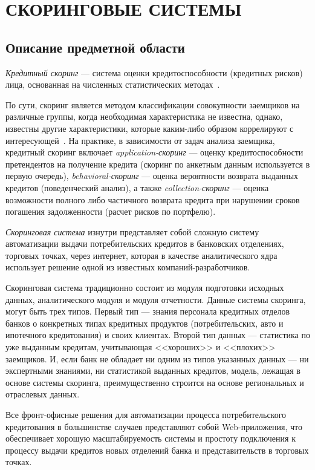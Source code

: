 \section[Скоринговые системы]{СКОРИНГОВЫЕ СИСТЕМЫ}

\subsection{Описание предметной области}

\emph{Кредитный скоринг} --- система оценки кредитоспособности (кредитных рисков) лица,
основанная на численных статистических методах~\cite{wiki_credit_score}.

По сути, скоринг является методом классификации совокупности заемщиков на различные группы,
когда необходимая характеристика не известна, однако, известны другие характеристики,
которые каким-либо образом коррелируют с интересующей~\cite{rumyantsev2006}.
На практике, в зависимости от задач анализа заемщика, кредитный скоринг включает
\emph{application-скоринг} --- оценку кредитоспособности претендентов на получение кредита
(скоринг по анкетным данным используется в первую очередь),
\emph{behavioral-скоринг} --- оценка вероятности возврата выданных кредитов
(поведенческий анализ), а также
\emph{collection-скоринг} --- оценка возможности полного либо частичного возврата кредита
при нарушении сроков погашения задолженности (расчет рисков по портфелю).

\emph{Скоринговая система} изнутри представляет собой сложную систему автоматизации
выдачи потребительских кредитов в банковских отделениях, торговых точках, через интернет,
которая в качестве аналитического ядра использует решение одной из известных компаний-разработчиков.

Скоринговая система традиционно состоит из модуля подготовки исходных данных,
аналитического модуля и модуля отчетности.
Данные системы скоринга, могут быть трех типов.
Первый тип --- знания персонала кредитных отделов банков о конкретных типах кредитных
продуктов (потребительских, авто и ипотечного кредитования) и своих клиентах.
Второй тип данных --- статистика по уже выданным кредитам, учитывающая <<хороших>>
и <<плохих>> заемщиков. И, если банк не обладает ни одним из типов указанных данных ---
ни экспертными знаниями, ни статистикой выданных кредитов, модель,
лежащая в основе системы скоринга, преимущественно строится на основе региональных и отраслевых данных.

Все фронт-офисные решения для автоматизации процесса потребительского кредитования в большинстве случаев
представляют собой Web-приложения, что обеспечивает хорошую масштабируемость системы и
простоту подключения к процессу выдачи кредитов новых отделений банка и представительств в торговых точках.

